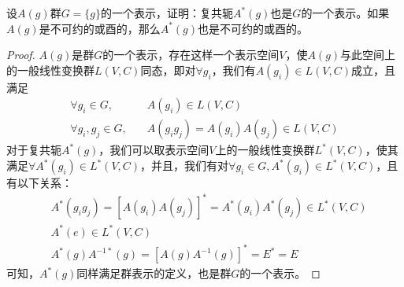 \begin{example}
	设$A(g)$群$G=\{g\}$的一个表示，证明：复共轭$A^{*}(g)$也是$G$的一个表示。如果$A(g)$是不可约的或酉的，那么$A^*(g)$也是不可约的或酉的。
	\begin{proof}
		$A(g)$是群$G$的一个表示，存在这样一个表示空间$V$，使$A(g)$与此空间上的一般线性变换群$L(V,C)$同态，即对$\forall g_i$，我们有$A(g_i) \in L(V, C)$成立，且满足
		\begin{equation*}
			\begin{aligned}
				\forall g_{i} \in G, \quad & A(g_i) \in L(V, C)	\\
				\forall g_{i}, g_{j} \in G, \quad & A(g_i g_j) = A(g_i) A(g_j) \in L(V, C)
			\end{aligned}
		\end{equation*}
		对于复共轭$A^*(g)$，我们可以取表示空间$V$上的一般线性变换群$L^* (V, C)$，使其满足$\forall A^* (g_i) \in L^* (V, C)$，并且，我们有对$\forall g_i \in G, A^*(g_i) \in L^*(V, C)$，且有以下关系：
		\begin{equation*}
			\begin{aligned}
				& A^* (g_i g_j) = [A(g_i) A(g_j)]^* = A^*(g_i) A^*(g_j) \in L^* (V, C)	\\
				& A^{*}(e) \in L^{*}(V, C) \\
				& A^{*}(g) A^{-1*}(g) = [A(g)A^{-1}(g)]^* = E^* = E
			\end{aligned}
		\end{equation*} 
		可知，$A^{*}(g)$同样满足群表示的定义，也是群$G$的一个表示。
	\end{proof}
\end{example}

